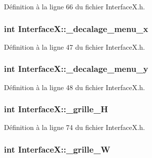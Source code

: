 Définition à la ligne 66 du fichier InterfaceX.h.

\hypertarget{a00011_a63d8eb39c2413f9525cb5af3795672ac}{
\subsubsection[{\_\-decalage\_\-menu\_\-x}]{\setlength{\rightskip}{0pt plus 5cm}int {\bf InterfaceX::\_\-decalage\_\-menu\_\-x}}}
\label{a00011_a63d8eb39c2413f9525cb5af3795672ac}


Définition à la ligne 47 du fichier InterfaceX.h.

\hypertarget{a00011_a4bc8fbcc5e5b60221023ecacac71ce57}{
\subsubsection[{\_\-decalage\_\-menu\_\-y}]{\setlength{\rightskip}{0pt plus 5cm}int {\bf InterfaceX::\_\-decalage\_\-menu\_\-y}}}
\label{a00011_a4bc8fbcc5e5b60221023ecacac71ce57}


Définition à la ligne 48 du fichier InterfaceX.h.

\hypertarget{a00011_a1b9e885d44b84e8c33dd37ca1e1c6f8e}{
\subsubsection[{\_\-grille\_\-H}]{\setlength{\rightskip}{0pt plus 5cm}int {\bf InterfaceX::\_\-grille\_\-H}}}
\label{a00011_a1b9e885d44b84e8c33dd37ca1e1c6f8e}


Définition à la ligne 74 du fichier InterfaceX.h.

\hypertarget{a00011_aff377fb4e786e623a8304c50648e7334}{
\subsubsection[{\_\-grille\_\-W}]{\setlength{\rightskip}{0pt plus 5cm}int {\bf InterfaceX::\_\-grille\_\-W}}}
\label{a00011_aff377fb4e786e623a8304c50648e7334}



